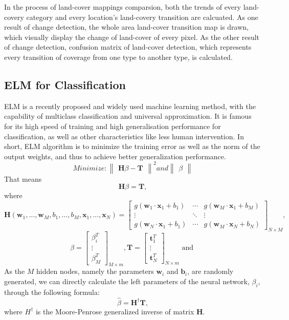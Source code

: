 \documentclass{elsart}
\begin{document}
In the process of land-cover mappings comparsion, both the trends of every land-covery category and every location's land-covery transition are calcuated.
As one result of change detection, the whole area land-cover transition map is drawn, which visually display the change of land-cover of every pixel.
As the other result of change detection, confusion matrix of land-cover detection, which represents every transition of coverage from one type to another type, is calculated.
\par

\subsection{ELM for Classification}
ELM is a recently proposed and widely used machine learning method, with the capability of multiclass classification and universal approximation\cite{Huang2012}\cite{Huang2000}\cite{Zhang2007}\cite{Huang2006}.
It is famous for its high speed of training and high generalisation performance for classification, as well as other characteristics like less human intervention.
In short, ELM algorithm is to minimize the training error as well as the norm of the output weights\cite{Huang2004}\cite{Huang2006a}, and thus to achieve better generalization performance. 
$$
Minimize: \begin{Vmatrix} \mathbf{H}\beta - \mathbf{T} \end{Vmatrix}^2 and \begin{Vmatrix} \beta \end{Vmatrix}
$$
That means
$$
\mathbf{H}\beta = \mathbf{T},
$$
where
$$
\mathbf{H}(\mathbf{w}_1,...,\mathbf{w}_M,b_1,...,b_M,\mathbf{x}_1,...,\mathbf{x}_N) = 
\begin{bmatrix}
g(\mathbf{w}_1 \cdot \mathbf{x}_1 + b_1) & \cdots & g(\mathbf{w}_M \cdot \mathbf{x}_1 + b_M) \\
\vdots & \ddots & \vdots \\
g(\mathbf{w}_N \cdot \mathbf{x}_1 + b_1) & \cdots & g(\mathbf{w}_M \cdot \mathbf{x}_N + b_N)
\end{bmatrix}_{N \times M}, 
$$
$$
\beta = \begin{bmatrix}\beta_i^T \\ \vdots \\ \beta_M^T \end{bmatrix}_{M \times m},  \mathbf{T} = \begin{bmatrix}\mathbf{t}_1^T \\ \vdots \\ \mathbf{t}_N^T \end{bmatrix}_{N \times m} \mbox{ and } 
$$
As the $M$ hidden nodes, namely the parameters $\mathbf{w}_i$ and $\mathbf{b}_i$, are randomly generated, we can directly calculate the left parameters of the neural network, $\beta_i$, through the following formula:
$$
	\widehat{\beta} = \mathbf{H}^{\dagger}\mathbf{T},
$$ 
where $H^{\dagger}$ is the Moore-Penrose generalized inverse of matrix $\mathbf{H}$.
\par
\end{document}
